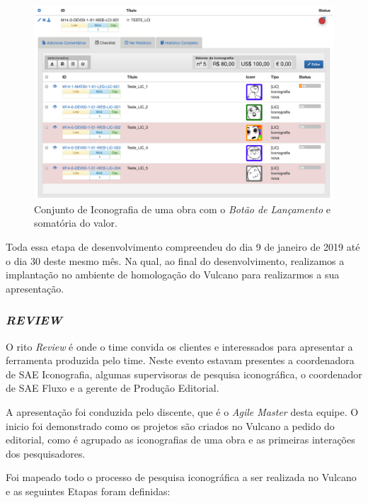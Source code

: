 \documentclass[
  12pt,				%
  openany,
  oneside,
  a4paper,			%
  english,			%
  brazil
]{article}
\numberwithin{figure}{section}
\numberwithin{table}{section}
\begin{document}
\begin{figure}[H]
	\centering
	\includegraphics[width=0.9\linewidth]{iconr_launch_checklist}
	\caption{Conjunto de Iconografia de uma obra com o \textit{Botão de Lançamento} e somatória do valor.}
	\label{fig:iconr:checklist}
\end{figure}

Toda essa etapa de desenvolvimento compreendeu do dia 9 de janeiro de 2019 até o dia 30 deste mesmo mês. Na qual, ao final do desenvolvimento, realizamos a implantação no ambiente de homologação do Vulcano para realizarmos a sua apresentação.


\subsubsection{\textit{REVIEW}}

O rito \textit{Review} é onde o time convida os clientes e interessados para apresentar a ferramenta produzida pelo time. Neste evento estavam presentes a coordenadora de SAE Iconografia, algumas supervisoras de pesquisa iconográfica, o coordenador de SAE Fluxo e a gerente de Produção Editorial.

A apresentação foi conduzida pelo discente, que é o \textit{Agile Master} desta equipe. O inicio foi demonstrado como os projetos são criados no Vulcano a pedido do editorial, como é agrupado as iconografias de uma obra e as primeiras interações dos pesquisadores.

Foi mapeado todo o processo de pesquisa iconográfica a ser realizada no Vulcano e as seguintes Etapas foram definidas:
\end{document}
